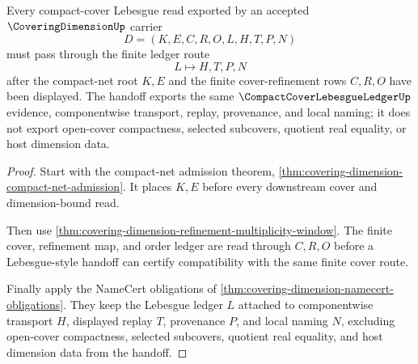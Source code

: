 \begin{theorem}
\label{thm:covering-dimension-lebesgue-ledger-handoff}
Every compact-cover Lebesgue read exported by an accepted $\CoveringDimensionUp$ carrier
$$
D=(K,E,C,R,O,L,H,T,P,N)
$$
must pass through the finite ledger route
$$
L \longmapsto H,T,P,N
$$
after the compact-net root $K,E$ and the finite cover-refinement rows $C,R,O$ have been displayed. The handoff exports the same $\CompactCoverLebesgueLedgerUp$ evidence, componentwise transport, replay, provenance, and local naming; it does not export open-cover compactness, selected subcovers, quotient real equality, or host dimension data.
\end{theorem}
\begin{proof}
Start with the compact-net admission theorem, \autoref{thm:covering-dimension-compact-net-admission}. It places $K,E$ before every downstream cover and dimension-bound read.

Then use \autoref{thm:covering-dimension-refinement-multiplicity-window}. The finite cover, refinement map, and order ledger are read through $C,R,O$ before a Lebesgue-style handoff can certify compatibility with the same finite cover route.

Finally apply the NameCert obligations of \autoref{thm:covering-dimension-namecert-obligations}. They keep the Lebesgue ledger $L$ attached to componentwise transport $H$, displayed replay $T$, provenance $P$, and local naming $N$, excluding open-cover compactness, selected subcovers, quotient real equality, and host dimension data from the handoff.
\end{proof}

